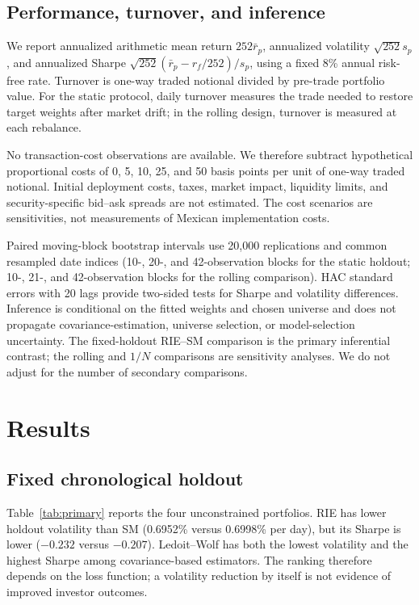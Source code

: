 \documentclass[11pt]{article}
\begin{document}
\subsection{Performance, turnover, and inference}

We report annualized arithmetic mean return $252\bar r_p$, annualized
volatility $\sqrt{252}s_p$, and annualized Sharpe
$\sqrt{252}(\bar r_p-r_f/252)/s_p$, using a fixed 8\% annual risk-free rate.
Turnover is one-way traded notional divided by pre-trade portfolio value.
For the static protocol, daily turnover measures the trade needed to restore
target weights after market drift; in the rolling design, turnover is
measured at each rebalance.

No transaction-cost observations are available. We therefore subtract
hypothetical proportional costs of 0, 5, 10, 25, and 50 basis points per
unit of one-way traded notional. Initial deployment costs, taxes,
market impact, liquidity limits, and security-specific bid--ask spreads are
not estimated. The cost scenarios are sensitivities, not measurements of
Mexican implementation costs.

Paired moving-block bootstrap intervals use 20,000 replications and common
resampled date indices (10-, 20-, and 42-observation blocks for the static
holdout; 10-, 21-, and 42-observation blocks for the rolling comparison).
HAC standard errors with 20 lags provide two-sided tests for Sharpe and
volatility differences. Inference is conditional on the fitted weights and
chosen universe and does not propagate covariance-estimation, universe
selection, or model-selection uncertainty. The fixed-holdout RIE--SM
comparison is the primary inferential contrast; the rolling and $1/N$
comparisons are sensitivity analyses. We do not adjust for the number of
secondary comparisons.

\section{Results}

\subsection{Fixed chronological holdout}

Table~\ref{tab:primary} reports the four unconstrained portfolios. RIE has
lower holdout volatility than SM (0.6952\% versus 0.6998\% per day), but its
Sharpe is lower ($-0.232$ versus $-0.207$). Ledoit--Wolf has both the lowest
volatility and the highest Sharpe among covariance-based estimators. The
ranking therefore depends on the loss function; a volatility reduction by
itself is not evidence of improved investor outcomes.
\end{document}
